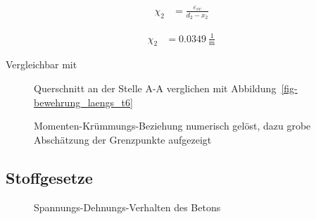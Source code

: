 \documentclass[
  11pt,
  letterpaper,
]{scrreprt}
\begin{document}
$$
\begin{aligned}
\chi_{2} &= \frac{ \varepsilon_{sv} }{ d_{2} - x_{2} } \; 
\end{aligned}
$$

$$
\begin{aligned}
\chi_{2} &= 0.0349\ \frac{1}{\mathrm{m}} \;
\end{aligned}
$$

Vergleichbar mit

\begin{figure}[H]


\caption{\label{fig-qs_a_a}Querschnitt an der Stelle A-A verglichen mit
Abbildung~\ref{fig-bewehrung_laengs_t6}}

\end{figure}%

\begin{figure}[H]


\caption{\label{fig-m_chi_schaetzung}Momenten-Krümmungs-Beziehung
numerisch gelöst, dazu grobe Abschätzung der Grenzpunkte aufgezeigt}

\end{figure}%

\subsection{Stoffgesetze}\label{stoffgesetze}

\begin{figure}[H]


\caption{\label{fig-sigma_epc_t6}Spannungs-Dehnungs-Verhalten des
Betons}

\end{figure}%
\end{document}
